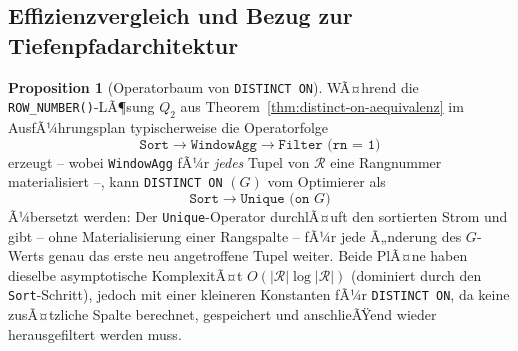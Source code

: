 ﻿\documentclass[a4paper,12pt]{report}
\theoremstyle{definition}
\newtheorem{proposition}[theorem]{Proposition}
\theoremstyle{remark}
\newcommand{\R}{\mathcal{R}}
\begin{document}
\subsection{Effizienzvergleich und Bezug zur Tiefenpfadarchitektur}
\label{sec:distinct-on-effizienz}

\begin{proposition}[Operatorbaum von \texttt{DISTINCT ON}]
\label{prop:distinct-on-plan}
WÃ¤hrend die \texttt{ROW\_NUMBER()}-LÃ¶sung $Q_2$ aus
Theorem~\ref{thm:distinct-on-aequivalenz} im AusfÃ¼hrungsplan
typischerweise die Operatorfolge
\[
  \texttt{Sort} \to \texttt{WindowAgg} \to \texttt{Filter (rn = 1)}
\]
erzeugt -- wobei \texttt{WindowAgg} fÃ¼r \emph{jedes} Tupel von $\R$
eine Rangnummer materialisiert --, kann \texttt{DISTINCT ON} $(G)$ vom
Optimierer als
\[
  \texttt{Sort} \to \texttt{Unique (on } G\texttt{)}
\]
Ã¼bersetzt werden: Der \texttt{Unique}-Operator durchlÃ¤uft den
sortierten Strom und gibt -- ohne Materialisierung einer
Rangspalte -- fÃ¼r jede Ã„nderung des $G$-Werts genau das erste neu
angetroffene Tupel weiter. Beide PlÃ¤ne haben dieselbe asymptotische
KomplexitÃ¤t $O(|\R|\log|\R|)$ (dominiert durch den
\texttt{Sort}-Schritt), jedoch mit einer kleineren Konstanten fÃ¼r
\texttt{DISTINCT ON}, da keine zusÃ¤tzliche Spalte berechnet,
gespeichert und anschlieÃŸend wieder herausgefiltert werden muss.
\end{proposition}
\end{document}
